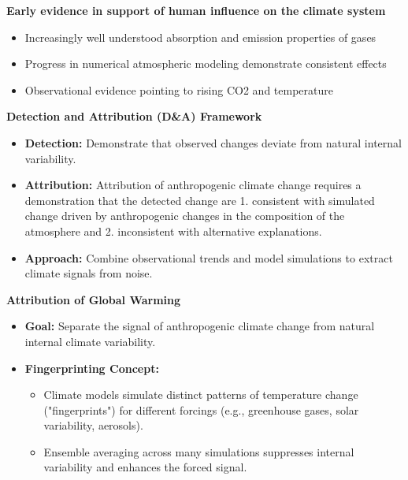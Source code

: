 \documentclass[fontsize=8pt, a4paper, landscape, fleqn]{scrartcl}
\renewcommand{\subsection}[1]{%
    \noindent\colorbox{subsectioncolor}{%
        \parbox{\dimexpr\columnwidth-2\fboxsep}{\color{white}\textbf{#1}}}%
    \vspace{0.5mm}%
}
\begin{document}
\begin{multicols*}{3}[\raggedcolumns]
\subsection{Early evidence in support of human influence on
the climate system}
\begin{itemize}
    \item Increasingly well understood absorption and emission properties of gases
    \item Progress in numerical atmospheric modeling demonstrate consistent effects
    \item Observational evidence pointing to rising CO2 and temperature
\end{itemize}

\subsection{Detection and Attribution (D\&A) Framework}
\begin{itemize}
    \item \textbf{Detection:} Demonstrate that observed changes deviate from natural internal variability.
    \item \textbf{Attribution:} Attribution of anthropogenic climate change requires a demonstration that the detected change are 1. consistent with simulated change driven by anthropogenic changes in the composition of the atmosphere and 2. inconsistent with alternative explanations.
    \item \textbf{Approach:} Combine observational trends and model simulations to extract climate signals from noise.
\end{itemize}

\subsection{Attribution of Global Warming}

\begin{itemize}
    \item \textbf{Goal:} Separate the signal of anthropogenic climate change from natural internal climate variability.
    
    \item \textbf{Fingerprinting Concept:}
    \begin{itemize}
        \item Climate models simulate distinct patterns of temperature change ("fingerprints") for different forcings (e.g., greenhouse gases, solar variability, aerosols).
        \item Ensemble averaging across many simulations suppresses internal variability and enhances the forced signal.
    \end{itemize}
    

\end{itemize}
\end{multicols*}
\end{document}
